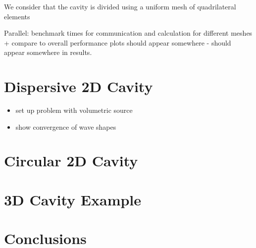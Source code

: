 We consider that the cavity is divided using a uniform mesh of quadrilateral elements




Parallel: benchmark times for communication and calculation for different meshes + compare to overall performance plots should appear somewhere - should appear somewhere in results.


\chapter{Dispersive 2D Cavity} %
\label{Chapter3}

\begin{itemize}
	\item set up problem with volumetric source
	\item show convergence of wave shapes
\end{itemize}

\chapter{Circular 2D Cavity} %
\label{Chapter3}

\chapter{3D Cavity Example} %
\label{Chapter3}

\chapter{Conclusions} %
